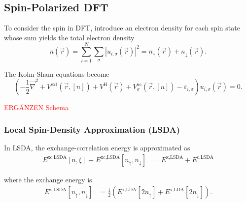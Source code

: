 \documentclass{article}
\newcommand{\lr}[1]{\left(#1\right)}
\begin{document}
\newpage


\subsection{Spin-Polarized DFT} %
To consider the spin in DFT, introduce an electron density for each spin state whose sum yields the total electron density
	\begin{equation}
		n(\vec{r}) = \sum_{i=1}^N \sum_\sigma |u_{i,\sigma}(\vec{r})|^2 = n_\uparrow(\vec{r}) + n_\downarrow(\vec{r}).
	\end{equation}

The Kohn-Sham equations become
		\begin{equation}
		\lr{	 -\frac{1}{2} \vec{\nabla}^2 + V^\text{ext}(\vec{r},[n]) + V^\text{H}(\vec{r}) + V_\sigma^\text{xc}(\vec{r},[n]) - \varepsilon_{i,\sigma} } u_{i,\sigma}(\vec{r}) = 0.
	\end{equation}

\textcolor{red}{ERGÄNZEN Schema}


\subsubsection{Local Spin-Density Approximation (LSDA)}
In LSDA, the exchange-correlation energy is approximated as
	\begin{align}
		E^\text{xc,LSDA}[n,\xi] \equiv E^\text{xc,LSDA}[n_\uparrow, n_\downarrow] &= E^\text{x,LSDA} + E^\text{c,LSDA}
	\end{align}

where the exchange energy is
	\begin{align}
	 E^\text{x,LSDA}[n_\uparrow, n_\downarrow] &= \frac{1}{2} \lr{ E^\text{x,LDA}[2n_\uparrow] + E^\text{x,LDA}[2n_\downarrow] }.
	\end{align}


\newpage
\end{document}

